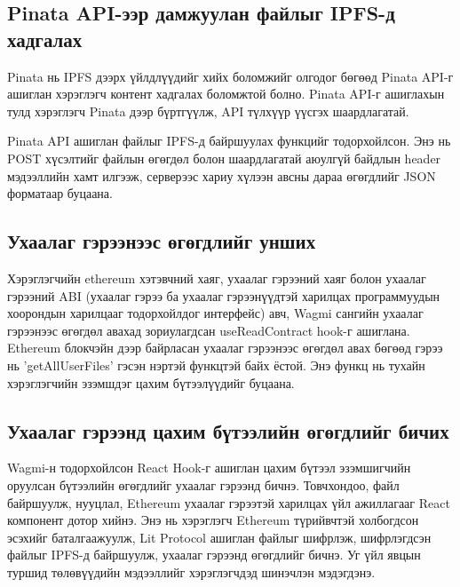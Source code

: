 


\subsection{Pinata API-ээр дамжуулан файлыг IPFS-д хадгалах}
Pinata нь IPFS дээрх үйлдлүүдийг хийх боломжийг олгодог бөгөөд Pinata API-г ашиглан хэрэглэгч контент хадгалах боломжтой болно. Pinata API-г ашиглахын тулд хэрэглэгч Pinata дээр бүртгүүлж, API түлхүүр үүсгэх шаардлагатай.

Pinata API ашиглан файлыг IPFS-д байршуулах функцийг тодорхойлсон. Энэ нь POST хүсэлтийг файлын өгөгдөл болон шаардлагатай аюулгүй байдлын header мэдээллийн хамт илгээж, серверээс хариу хүлээн авсны дараа өгөгдлийг JSON форматаар буцаана.


\subsection{Ухаалаг гэрээнээс өгөгдлийг унших}
Хэрэглэгчийн ethereum хэтэвчний хаяг, ухаалаг гэрээний хаяг болон ухаалаг гэрээний ABI (ухаалаг гэрээ ба ухаалаг гэрээнүүдтэй харилцах программуудын хоорондын харилцааг тодорхойлдог интерфейс) авч, Wagmi сангийн ухаалаг гэрээнээс өгөгдөл авахад зориулагдсан useReadContract hook-г ашиглана. Ethereum блокчэйн дээр байрласан ухаалаг гэрээнээс өгөгдөл авах бөгөөд гэрээ нь 'getAllUserFiles' гэсэн нэртэй функцтэй байх ёстой. Энэ функц нь тухайн хэрэглэгчийн эзэмшдэг цахим бүтээлүүдийг буцаана.


\subsection{Ухаалаг гэрээнд цахим бүтээлийн өгөгдлийг бичих}
Wagmi-н тодорхойлсон React Hook-г ашиглан цахим бүтээл эзэмшигчийн оруулсан бүтээлийн өгөгдлийг ухаалаг гэрээнд бичнэ.
Товчхондоо, файл байршуулж, нууцлал, Ethereum ухаалаг гэрээтэй харилцах үйл ажиллагааг React компонент дотор хийнэ. Энэ нь хэрэглэгч Ethereum түрийвчтэй холбогдсон эсэхийг баталгаажуулж, Lit Protocol ашиглан файлыг шифрлэж, шифрлэгдсэн файлыг IPFS-д байршуулж, ухаалаг гэрээнд өгөгдлийг бичнэ. Уг үйл явцын туршид төлөвүүдийн мэдээллийг хэрэглэгчдэд шинэчлэн мэдэгдэнэ.



